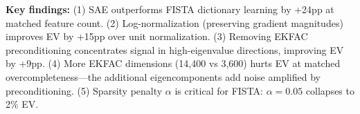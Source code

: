 \begin{table}[t]
\begin{minipage}{\linewidth}
\textbf{Key findings:} (1) SAE outperforms FISTA dictionary learning by +24pp at matched feature count. (2) Log-normalization (preserving gradient magnitudes) improves EV by +15pp over unit normalization. (3) Removing EKFAC preconditioning concentrates signal in high-eigenvalue directions, improving EV by +9pp. (4) More EKFAC dimensions (14{,}400 vs 3{,}600) hurts EV at matched overcompleteness---the additional eigencomponents add noise amplified by preconditioning. (5) Sparsity penalty $\alpha$ is critical for FISTA: $\alpha{=}0.05$ collapses to 2\% EV.
\end{minipage}
\end{table}
